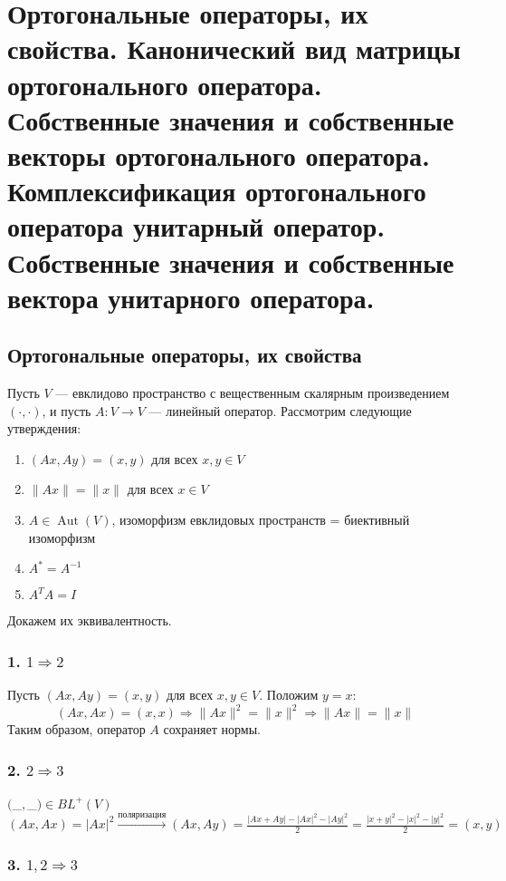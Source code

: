 \documentclass[12pt]{article}
\begin{document}
\[\]

\section{Ортогональные операторы, их свойства. Канонический вид матрицы ортогонального оператора.
 Собственные значения и собственные векторы ортогонального оператора. Комплексификация
 ортогонального оператора унитарный оператор. Собственные значения и собственные вектора
 унитарного оператора.}

\subsection*{Ортогональные операторы, их свойства}

Пусть $ V $ — евклидово пространство с вещественным скалярным произведением $ (\cdot, \cdot) $, и пусть $ A: V \to V $ — линейный оператор. Рассмотрим следующие утверждения:

\begin{enumerate}
    \item $ (Ax, Ay) = (x, y) $ для всех $ x, y \in V $
    \item $ \|Ax\| = \|x\| $ для всех $ x \in V $
    \item $ A \in \operatorname{Aut}(V) $, изоморфизм евклидовых пространств = биективный изоморфизм
    \item $ A^* = A^{-1} $
    \item $ A^T A = I $
\end{enumerate}

Докажем их эквивалентность.

\subsubsection*{1. $ 1 \Rightarrow 2 $}

Пусть $ (Ax, Ay) = (x, y) $ для всех $ x, y \in V $. Положим $ y = x $:
$$
(Ax, Ax) = (x, x)
\Rightarrow \|Ax\|^2 = \|x\|^2
\Rightarrow \|Ax\| = \|x\|
$$
Таким образом, оператор $ A $ сохраняет нормы.

\subsubsection*{2. $ 2 \Rightarrow 3 $}
$($_$,$_$) \in BL^+(V)$
\[\]
$(Ax,Ax) = |Ax|^2 \xrightarrow{поляризация} (Ax, Ay) = \frac{|Ax + Ay| - |Ax|^2 - |Ay|^2}{2} = \frac{|x+y|^2 - |x|^2 - |y|^2}{2} = (x,y)$

\subsubsection*{3. $ 1, 2\Rightarrow 3 $}
\end{document}
